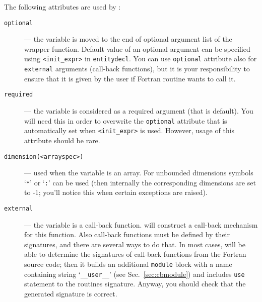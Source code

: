 The following attributes are used by \fpy:
\begin{description}
\item[\texttt{optional}] --- the variable is moved to the end of
  optional argument list of the wrapper function. Default value of an
  optional argument can be specified using \texttt{<init\_expr>} in
  \texttt{entitydecl}.  You can use \texttt{optional} attribute also for
  \texttt{external} arguments (call-back functions), but it is your
  responsibility to ensure that it is given by the user if Fortran
  routine wants to call it.
\item[\texttt{required}] --- the variable is considered as a required
  argument (that is default). You will need this in order to overwrite
  the \texttt{optional} attribute that is automatically set when
  \texttt{<init\_expr>} is used. However, usage of this attribute
  should be rare.
\item[\texttt{dimension(<arrayspec>)}] --- used when the variable is
  an array. For unbounded dimensions symbols `\texttt{*}' or
  `\texttt{:}' can be used (then internally the corresponding
  dimensions are set to -1; you'll notice this when certain exceptions
  are raised).
\item[\texttt{external}] --- the variable is a call-back function. \fpy will
  construct a call-back mechanism for this function. Also call-back
  functions must be defined by their signatures, and there are several
  ways to do that. In most cases, \fpy will be able to determine the signatures
  of  call-back functions from the Fortran source code; then it
  builds an additional \texttt{module} block with a name containing
  string `\texttt{\_\_user\_\_}' (see Sec.~\ref{sec:cbmodule}) and
  includes \texttt{use} statement to the routines signature. Anyway,
  you should check that the generated signature is correct.
  

\end{description}
